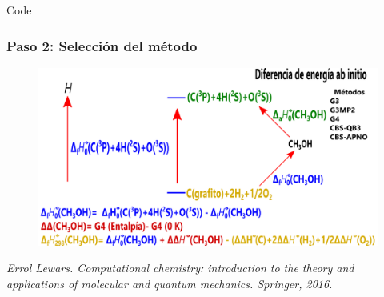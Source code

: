 \documentclass{beamer}
\begin{document}
\begin{frame}[fragile]{Code}
\frametitle{Paso 2: Selección del método}
\begin{figure}
\includegraphics[scale=.5]{images/atomization-CH3OH}
\end{figure}
\tiny{\textit{Errol Lewars. Computational chemistry: introduction to the theory and applications of molecular and quantum mechanics. Springer, 2016.}}

\end{frame}

\end{document}
